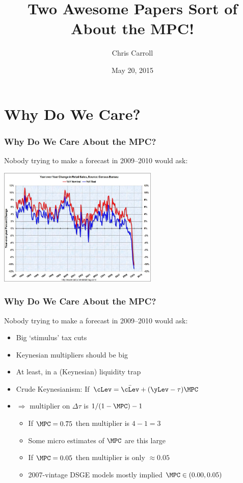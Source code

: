 \documentclass[public]{cfpbpresentation}
\begin{document}
\title{Two Awesome Papers Sort of About the MPC!}
\author{Chris Carroll}
\date{May 20, 2015}


\begin{frame}
  \titlepage
\end{frame}

\section{Why Do We Care?}

\begin{frame}\frametitle{Why Do We Care About the MPC?}


\pause Nobody trying to make a forecast in 2009--2010 would ask: \pause

\centerline{\includegraphics[width=3in]{./Figures/Retail-Sales-Collapse.jpg}}
\end{frame}

\begin{frame}\frametitle{Why Do We Care About the MPC?}

Nobody trying to make a forecast in 2009--2010 would ask: 

\begin{itemize}
\item Big `stimulus' tax cuts
\item Keynesian multipliers should be big
\bi
\item At least, in a (Keynesian) liquidity trap 
\ei
\item Crude Keynesianism: If $\cLev = \bar{\cLev} + (\yLev-\tau) \MPC$ 
\item $\Rightarrow$ multiplier on $\Delta \tau$ is $1/(1-\MPC) - 1$
\begin{itemize}
\item If $\MPC = 0.75$ then multiplier is $4-1=3$ \pause
\bi
\item Some micro estimates of $\MPC$ are this large
\ei
\item If $\MPC = 0.05$ then multiplier is only $\approx 0.05$
\bi
\item 2007-vintage DSGE models mostly implied $\MPC \in (0.00, 0.05)$
\ei
\end{itemize}
\end{itemize}

\end{frame}
\end{document}
